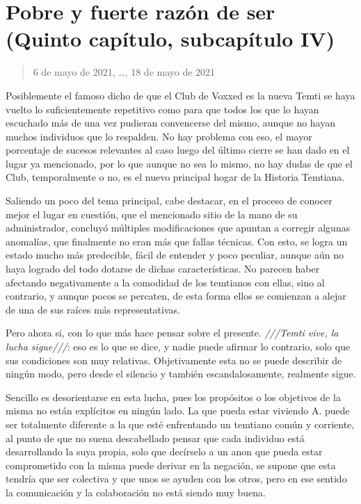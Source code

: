 \documentclass[
  spanish,
]{book}
\begin{document}
\hypertarget{pobre-y-fuerte-razuxf3n-de-ser-quinto-capuxedtulo-subcapuxedtulo-iv}{%
\section{Pobre y fuerte razón de ser (Quinto capítulo, subcapítulo IV)}\label{pobre-y-fuerte-razuxf3n-de-ser-quinto-capuxedtulo-subcapuxedtulo-iv}}

\begin{quote}
6 de mayo de 2021, \ldots, 18 de mayo de 2021
\end{quote}

Posiblemente el famoso dicho de que el Club de Voxxed es la nueva Temti se haya vuelto lo suficientemente repetitivo como para que todos los que lo hayan escuchado más de una vez pudieran convencerse del mismo, aunque no hayan muchos individuos que lo respalden. No hay problema con eso, el mayor porcentaje de sucesos relevantes al caso luego del último cierre se han dado en el lugar ya mencionado, por lo que aunque no sea lo mismo, no hay dudas de que el Club, temporalmente o no, es el nuevo principal hogar de la Historia Temtiana.

Saliendo un poco del tema principal, cabe destacar, en el proceso de conocer mejor el lugar en cuestión, que el mencionado sitio de la mano de su administrador, concluyó múltiples modificaciones que apuntan a corregir algunas anomalías, que finalmente no eran más que fallas técnicas. Con esto, se logra un estado mucho más predecible, fácil de entender y poco peculiar, aunque aún no haya logrado del todo dotarse de dichas características. No parecen haber afectando negativamente a la comodidad de los temtianos con ellas, sino al contrario, y aunque pocos se percaten, de esta forma ellos se comienzan a alejar de una de sus raíces más representativas.

Pero ahora si, con lo que más hace pensar sobre el presente. \emph{///Temti vive, la lucha sigue///}: eso es lo que se dice, y nadie puede afirmar lo contrario, solo que sus condiciones son muy relativas. Objetivamente esta no se puede describir de ningún modo, pero desde el silencio y también escandalosamente, realmente sigue.

Sencillo es desorientarse en esta lucha, pues los propósitos o los objetivos de la misma no están explícitos en ningún lado. La que pueda estar viviendo A. puede ser totalmente diferente a la que esté enfrentando un temtiano común y corriente, al punto de que no suena descabellado pensar que cada individuo está desarrollando la suya propia, solo que decírselo a un anon que pueda estar comprometido con la misma puede derivar en la negación, se supone que esta tendría que ser colectiva y que unos se ayuden con los otros, pero en ese sentido la comunicación y la colaboración no está siendo muy buena.
\end{document}
